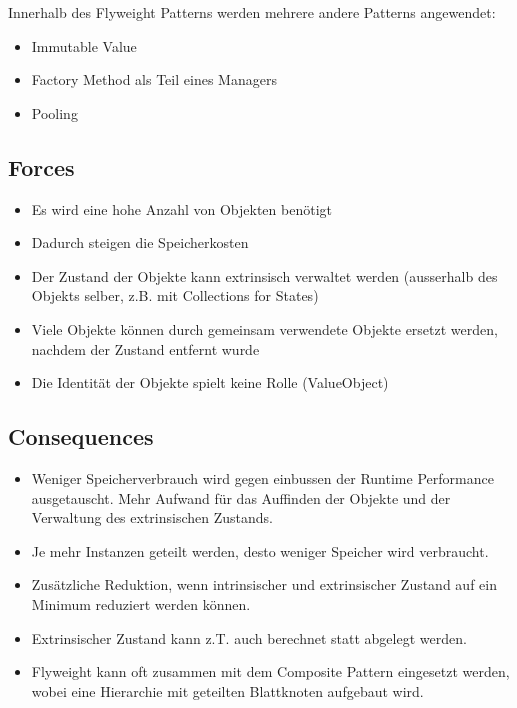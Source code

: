 Innerhalb des Flyweight Patterns werden mehrere andere Patterns angewendet:

\begin{itemize}
	\item Immutable Value
	\item Factory Method als Teil eines Managers
	\item Pooling
\end{itemize}

\subsection*{Forces}

\begin{itemize}
	\item Es wird eine hohe Anzahl von Objekten benötigt
	\item Dadurch steigen die Speicherkosten
	\item Der Zustand der Objekte kann extrinsisch verwaltet werden (ausserhalb des Objekts selber, z.B. mit Collections for States)
	\item Viele Objekte können durch gemeinsam verwendete Objekte ersetzt werden, nachdem der Zustand entfernt wurde
	\item Die Identität der Objekte spielt keine Rolle (ValueObject)
\end{itemize}

\subsection*{Consequences}

\begin{itemize}
	\item Weniger Speicherverbrauch wird gegen einbussen der Runtime Performance ausgetauscht. Mehr Aufwand für das Auffinden der Objekte und der Verwaltung des extrinsischen Zustands.
	\item Je mehr Instanzen geteilt werden, desto weniger Speicher wird verbraucht.
	\item Zusätzliche Reduktion, wenn intrinsischer und extrinsischer Zustand auf ein Minimum reduziert werden können.
	\item Extrinsischer Zustand kann z.T. auch berechnet statt abgelegt werden.
	\item Flyweight kann oft zusammen mit dem Composite Pattern eingesetzt werden, wobei eine Hierarchie mit geteilten Blattknoten aufgebaut wird.
\end{itemize}

